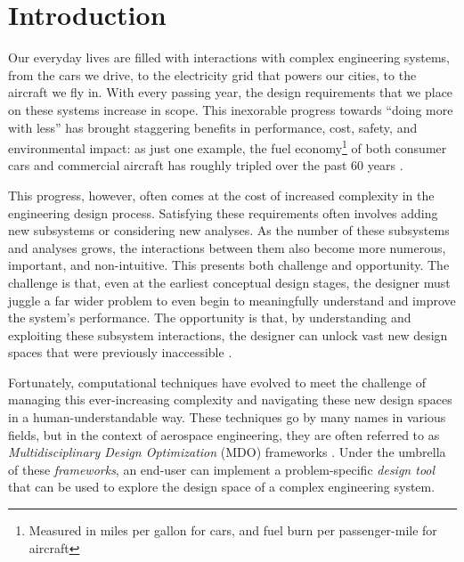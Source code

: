 \chapter{Introduction}
\label{chap:intro}


Our everyday lives are filled with interactions with complex engineering systems, from the cars we drive, to the electricity grid that powers our cities, to the aircraft we fly in. With every passing year, the design requirements that we place on these systems increase in scope. This inexorable progress towards ``doing more with less'' has brought staggering benefits in performance, cost, safety, and environmental impact: as just one example, the fuel economy\footnote{Measured in miles per gallon for cars, and fuel burn per passenger-mile for aircraft} of both consumer cars and commercial aircraft has roughly tripled over the past 60 years \cite{EPA_Automotive_Trends_2023, drela_tedx}.

This progress, however, often comes at the cost of increased complexity in the engineering design process. Satisfying these requirements often involves adding new subsystems or considering new analyses. As the number of these subsystems and analyses grows, the interactions between them also become more numerous, important, and non-intuitive. This presents both challenge and opportunity. The challenge is that, even at the earliest conceptual design stages, the designer must juggle a far wider problem to even begin to meaningfully understand and improve the system's performance. The opportunity is that, by understanding and exploiting these subsystem interactions, the designer can unlock vast new design spaces that were previously inaccessible \cite{drela_design_2011}.

Fortunately, computational techniques have evolved to meet the challenge of managing this ever-increasing complexity and navigating these new design spaces in a human-understandable way. These techniques go by many names in various fields, but in the context of aerospace engineering, they are often referred to as \emph{Multidisciplinary Design Optimization} (MDO) frameworks \cite{martins_multidisciplinary_2013}. Under the umbrella of these \emph{frameworks}, an end-user can implement a problem-specific \emph{design tool} that can be used to explore the design space of a complex engineering system.

